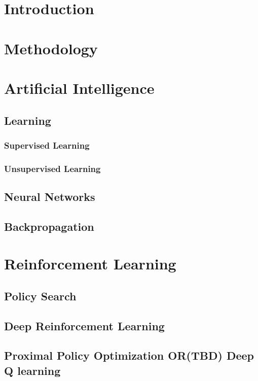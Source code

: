 \chapter{Introduction}

\chapter{Methodology}


\chapter{Artificial Intelligence}

\section{Learning}

\subsection{Supervised Learning}

\subsection{Unsupervised Learning}
\section{Neural Networks}
\section{Backpropagation}

\chapter{Reinforcement Learning}
\section{Policy Search}
\section{Deep Reinforcement Learning}

\section{Proximal Policy Optimization OR(TBD) Deep Q learning}


